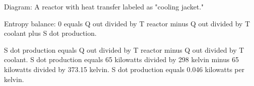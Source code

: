 Diagram: A reactor with heat transfer labeled as "cooling jacket."  

Entropy balance:  
0 equals Q out divided by T reactor minus Q out divided by T coolant plus S dot production.  

S dot production equals Q out divided by T reactor minus Q out divided by T coolant.  
S dot production equals 65 kilowatts divided by 298 kelvin minus 65 kilowatts divided by 373.15 kelvin.  
S dot production equals 0.046 kilowatts per kelvin.
